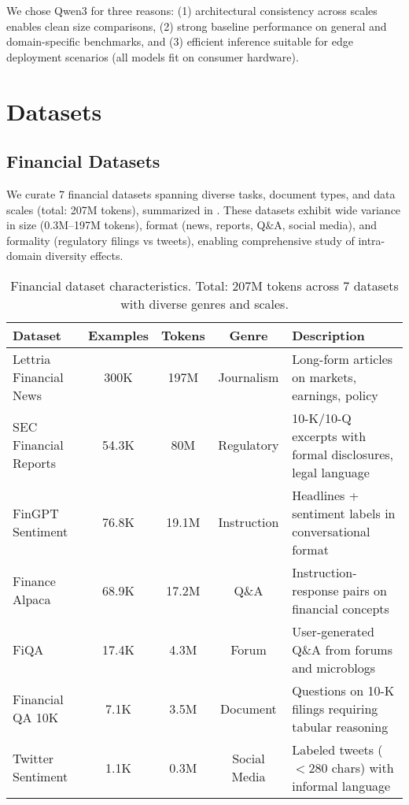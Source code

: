 We chose Qwen3 for three reasons: (1) architectural consistency across scales enables clean size comparisons, (2) strong baseline performance on general and domain-specific benchmarks, and (3) efficient inference suitable for edge deployment scenarios (all models fit on consumer hardware).

\section{Datasets}

\subsection{Financial Datasets}

We curate 7 financial datasets spanning diverse tasks, document types, and data scales (total: 207M tokens), summarized in . These datasets exhibit wide variance in size (0.3M--197M tokens), format (news, reports, Q\&A, social media), and formality (regulatory filings vs tweets), enabling comprehensive study of intra-domain diversity effects.

\begin{table}[h]
\centering
\caption[Financial Dataset Characteristics]{Financial dataset characteristics. Total: 207M tokens across 7 datasets with diverse genres and scales.}
\label{tab:financial_datasets}
\small
\begin{tabular}{p{3cm}cccp{5.5cm}}
\toprule
\textbf{Dataset} & \textbf{Examples} & \textbf{Tokens} & \textbf{Genre} & \textbf{Description} \\
\midrule
Lettria Financial News & 300K & 197M & Journalism & Long-form articles on markets, earnings, policy \\
\midrule
SEC Financial Reports & 54.3K & 80M & Regulatory & 10-K/10-Q excerpts with formal disclosures, legal language \\
\midrule
FinGPT Sentiment & 76.8K & 19.1M & Instruction & Headlines + sentiment labels in conversational format \\
\midrule
Finance Alpaca & 68.9K & 17.2M & Q\&A & Instruction-response pairs on financial concepts \\
\midrule
FiQA & 17.4K & 4.3M & Forum & User-generated Q\&A from forums and microblogs \\
\midrule
Financial QA 10K & 7.1K & 3.5M & Document & Questions on 10-K filings requiring tabular reasoning \\
\midrule
Twitter Sentiment & 1.1K & 0.3M & Social Media & Labeled tweets ($<$280 chars) with informal language \\
\bottomrule
\end{tabular}
\end{table}

